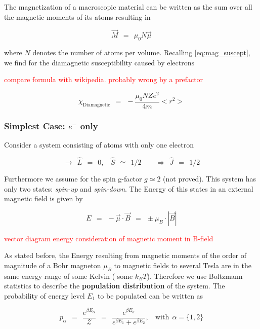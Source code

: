 \documentclass[10pt]{report}
\numberwithin{equation}{chapter}
\begin{document}
The magnetization of a macroscopic material can be written as the sum over all the magnetic moments of its atoms resulting in

\begin{equation}
  \vec{M} ~~=~~ \mu_0 N \vec{\mu}
\end{equation}

where $N$ denotes the number of atoms per volume. Recalling \ref{eq:mag_suscept}, we find for the diamagnetic susceptibility caused by electrons

\textcolor{red}{compare formula with wikipedia. probably wrong by a prefactor}

\begin{equation}
  \chi_\text{Diamagnetic} ~~=~~ -\frac{\mu_0 N Z e^2}{4m} <r^2>
\end{equation}


\subsubsection{Simplest Case: $e^-$ only}

Consider a system consisting of atoms with only one electron

\begin{equation}
  \rightarrow ~~ \hat{L} ~~=~~0, ~~~~ \hat{S} ~~≃~~ 1/2 ~~~~~~~~~\Rightarrow ~~ \hat{J} ~~=~~ 1/2
\end{equation}

Furthermore we assume for the spin g-factor $g \simeq 2$ (not proved). This system has only two states: \textit{spin-up} and \textit{spin-down}.
The Energy of this states in an external magnetic field is given by

\begin{equation}
  E ~~=~~ - \vec{\mu} \cdot \vec{B} ~~=~~ \pm \mu_B \cdot |\vec{B}|
\end{equation}

\textcolor{red}{ vector diagram energy consideration of magnetic moment in B-field}

As stated before, the Energy resulting from magnetic moments of the order of magnitude of a Bohr magneton $\mu_B$ to magnetic fields to several Tesla are in the same energy range of some Kelvin ( some $k_B T$). Therefore we use Boltzmann statistics to describe the \textbf{population distribution} of the system. The probability of energy level $E_1$ to be populated can be written as

\begin{equation}
  p_\alpha ~~=~~ \frac{e^{\beta E_\alpha}}{\mathcal{Z}} ~~=~~ \frac{e^{\beta E_\alpha}}{e^{\beta E_1} + e^{\beta E_2}}, ~~~~ \text{with} ~~ \alpha = \{1,2\}
\end{equation}
\end{document}
